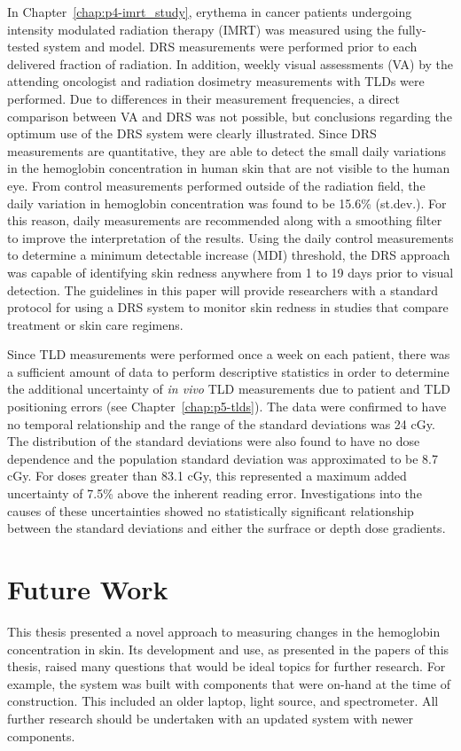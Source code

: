 In Chapter~\ref{chap:p4-imrt_study}, erythema in cancer patients undergoing intensity modulated radiation therapy (IMRT) was measured using the fully-tested system and model. DRS measurements were performed prior to each delivered fraction of radiation. In addition, weekly visual assessments (VA) by the attending oncologist and radiation dosimetry measurements with TLDs were performed. Due to differences in their measurement frequencies, a direct comparison between VA and DRS was not possible, but conclusions regarding the optimum use of the DRS system were clearly illustrated. Since DRS measurements are quantitative, they are able to detect the small daily variations in the hemoglobin concentration in human skin that are not visible to the human eye. From control measurements performed outside of the radiation field, the daily variation in hemoglobin concentration was found to be 15.6\% (st.dev.). For this reason, daily measurements are recommended along with a smoothing filter to improve the interpretation of the results. Using the daily control measurements to determine a minimum detectable increase (MDI) threshold, the DRS approach was capable of identifying skin redness anywhere from 1 to 19 days prior to visual detection. The guidelines in this paper will provide researchers with a standard protocol for using a DRS system to monitor skin redness in studies that compare treatment or skin care regimens.

Since TLD measurements were performed once a week on each patient, there was a sufficient amount of data to perform descriptive statistics in order to determine the additional uncertainty of \emph{in vivo} TLD measurements due to patient and TLD positioning errors (see Chapter~\ref{chap:p5-tlds}). The data were confirmed to have no temporal relationship and the range of the standard deviations was 24 cGy. The distribution of the standard deviations were also found to have no dose dependence and the population standard deviation was approximated to be 8.7 cGy. For doses greater than 83.1 cGy, this represented a maximum added uncertainty of 7.5\% above the inherent reading error. Investigations into the causes of these uncertainties showed no statistically significant relationship between the standard deviations and either the surfrace or depth dose gradients.

\section{Future Work}
This thesis presented a novel approach to measuring changes in the hemoglobin concentration in skin. Its development and use, as presented in the papers of this thesis, raised many questions that would be ideal topics for further research. For example, the system was built with components that were on-hand at the time of construction. This included an older laptop, light source, and spectrometer. All further research should be undertaken with an updated system with newer components.


